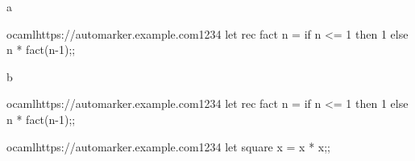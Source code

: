 


    \begin{question}{1}
        \begin{subquestion}{a}
            \begin{automarkable}{ocaml}{https://automarker.example.com}{1234}
                let rec fact n =
                  if n <= 1 then 1 else n * fact(n-1);;
            \end{automarkable}
        \end{subquestion}
        \begin{subquestion}{b}
            \begin{automarkable}{ocaml}{https://automarker.example.com}{1234}
                let rec fact n =
                  if n <= 1 then 1 else n * fact(n-1);;
            \end{automarkable}
        \end{subquestion}
    \end{question}

    \begin{question}{2}
        \begin{automarkable}{ocaml}{https://automarker.example.com}{1234}
            let square x = x * x;;
        \end{automarkable}
    \end{question}

